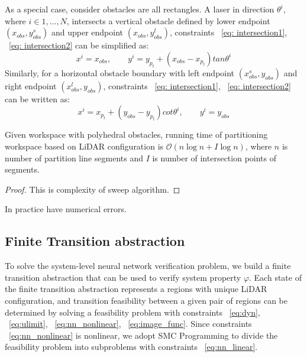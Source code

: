 As a special case, consider obstacles are all rectangles. 
A laser in direction $\theta^i$, where $i \in {1, ..., N}$, intersects a vertical obstacle 
defined by lower endpoint $(x_{obs}, y_{obs}^s)$ and upper endpoint $(x_{obs}, y_{obs}^l)$, 
constraints ~\eqref{eq: intersection1}, ~\eqref{eq: intersection2} can be simplified as:
\begin{equation}
    \label{eq:vertical}
    x^i = x_{obs}, \qquad y^i = y_{p_t} + (x_{obs} - x_{p_t}) tan \theta^i
\end{equation}
Similarly, for a horizontal obstacle boundary with left endpoint $(x_{obs}^s, y_{obs})$ and right endpoint $(x_{obs}^l, y_{obs})$,
constraints ~\eqref{eq: intersection1}, ~\eqref{eq: intersection2} can be written as:
\begin{equation} 
    \label{eq:horizontal}
    x^i = x_{p_t} + (y_{obs} - y_{p_t}) cot \theta^i, \qquad y^i = y_{obs}
\end{equation}


\begin{theorem}
    Given workspace with polyhedral obstacles, running time of partitioning workspace based on LiDAR configuration is
    $\mathcal{O}(n\log{}n + I\log{}n)$, where $n$ is number of partition line segments 
    and $I$ is number of intersection points of segments.
    \begin{proof}
        {\color{blue} This is complexity of sweep algorithm.} 
    \end{proof}
\end{theorem}    

{\color{blue} In practice have numerical errors.}




\subsection{Finite Transition abstraction}

To solve the system-level neural network verification problem, 
we build a finite transition abstraction that can be used to verify system property $\varphi$.
Each state of the finite transition abstraction represents a regions with unique LiDAR configuration,
and transition feasibility between a given pair of regions can be determined by solving a feasibility problem 
with constraints ~\eqref{eq:dyn}, ~\eqref{eq:ulimit}, ~\eqref{eq:nn_nonlinear}, ~\eqref{eq:image_func}.
Since constraints ~\eqref{eq:nn_nonlinear} is nonlinear, we adopt SMC Programming to
divide the feasibility problem into subproblems with constraints ~\eqref{eq:nn_linear}.



